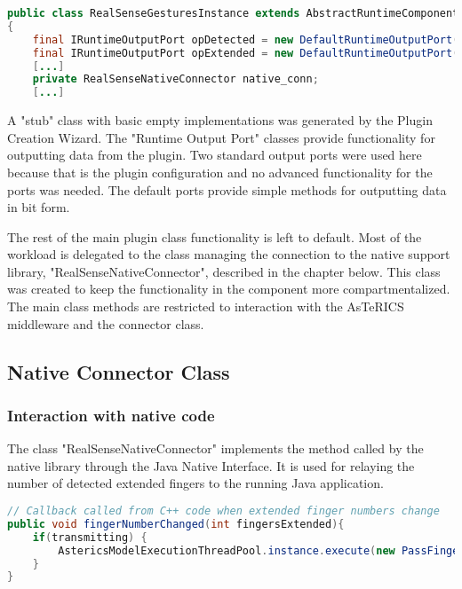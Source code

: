 \documentclass[BSA,Bachelor,english]{twbook}%
\begin{document}
\begin{lstlisting}[language=Java,name={Main plugin class and member variables},label={rs:javaplugin:1}]
public class RealSenseGesturesInstance extends AbstractRuntimeComponentInstance
{
	final IRuntimeOutputPort opDetected = new DefaultRuntimeOutputPort();
	final IRuntimeOutputPort opExtended = new DefaultRuntimeOutputPort();
	[...]
	private RealSenseNativeConnector native_conn;
	[...]
\end{lstlisting}

A "stub" class with basic empty implementations was generated by the Plugin Creation Wizard. The "Runtime Output Port" classes provide functionality for outputting data from the plugin. Two standard output ports were used here because that is the plugin configuration and no advanced functionality for the ports was needed. The default ports provide simple methods for outputting data in bit form.

The rest of the main plugin class functionality is left to default. Most of the workload is delegated to the class managing the connection to the native support library, "RealSenseNativeConnector", described in the chapter below. This class was created to keep the functionality in the component more compartmentalized. The main class methods are restricted to interaction with the AsTeRICS middleware and the connector class.

\subsection{Native Connector Class}

\subsubsection{Interaction with native code}

The class "RealSenseNativeConnector" implements the method called by the native library through the Java Native Interface. It is used for relaying the number of detected extended fingers to the running Java application.

\begin{lstlisting}[language=Java,name={Java Native Interface callback method},label={rs:javaplugin:3}]
// Callback called from C++ code when extended finger numbers change
public void fingerNumberChanged(int fingersExtended){
	if(transmitting) {
		AstericsModelExecutionThreadPool.instance.execute(new PassFingersRunnable(fingersExtended));
	}
}
\end{lstlisting}
\end{document}
